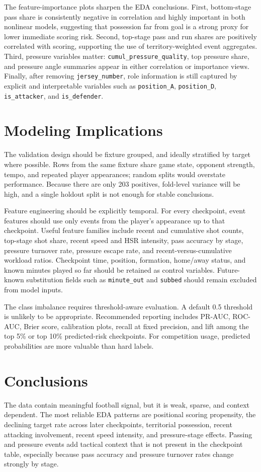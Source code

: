 \documentclass[11pt]{article}
\begin{document}
The feature-importance plots sharpen the EDA conclusions.
First, bottom-stage pass share is consistently negative in correlation and highly important in both nonlinear models, suggesting that possession far from goal is a strong proxy for lower immediate scoring risk.
Second, top-stage pass and run shares are positively correlated with scoring, supporting the use of territory-weighted event aggregates.
Third, pressure variables matter: \texttt{cumul\_pressure\_quality}, top pressure share, and pressure angle summaries appear in either correlation or importance views.
Finally, after removing \texttt{jersey\_number}, role information is still captured by explicit and interpretable variables such as \texttt{position\_A}, \texttt{position\_D}, \texttt{is\_attacker}, and \texttt{is\_defender}.

\section{Modeling Implications}
The validation design should be fixture grouped, and ideally stratified by target where possible.
Rows from the same fixture share game state, opponent strength, tempo, and repeated player appearances; random splits would overstate performance.
Because there are only 203 positives, fold-level variance will be high, and a single holdout split is not enough for stable conclusions.

Feature engineering should be explicitly temporal.
For every checkpoint, event features should use only events from the player's appearance up to that checkpoint.
Useful feature families include recent and cumulative shot counts, top-stage shot share, recent speed and HSR intensity, pass accuracy by stage, pressure turnover rate, pressure escape rate, and recent-versus-cumulative workload ratios.
Checkpoint time, position, formation, home/away status, and known minutes played so far should be retained as control variables.
Future-known substitution fields such as \texttt{minute\_out} and \texttt{subbed} should remain excluded from model inputs.

The class imbalance requires threshold-aware evaluation.
A default 0.5 threshold is unlikely to be appropriate.
Recommended reporting includes PR-AUC, ROC-AUC, Brier score, calibration plots, recall at fixed precision, and lift among the top 5\% or top 10\% predicted-risk checkpoints.
For competition usage, predicted probabilities are more valuable than hard labels.

\section{Conclusions}
The data contain meaningful football signal, but it is weak, sparse, and context dependent.
The most reliable EDA patterns are positional scoring propensity, the declining target rate across later checkpoints, territorial possession, recent attacking involvement, recent speed intensity, and pressure-stage effects.
Passing and pressure events add tactical context that is not present in the checkpoint table, especially because pass accuracy and pressure turnover rates change strongly by stage.
\end{document}

